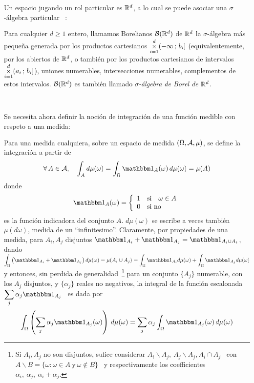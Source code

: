 Un espacio  jugando un rol particular es  $\mathbb{R}^d$, a lo cual  se puede asociar
una    $\sigma$-\'algebra    particular    ~\cite{AthLah06, Bog07:v1, Bog07:v2, Coh13}:
%
\begin{definicion}
  Para  cualquier  $d  \ge  1$  entero,  llamamos  Borelianos  $\mathcal{B}(\mathbb{R}^d)$  de
  $\mathbb{R}^d$  la $\sigma$-\'algebra  m\'as peque\~na  generada por  los productos
  cartesianos   $\displaystyle   \operatorname*{\times}_{i=1}^d  (-\infty   \,   ;  \,   b_i]$
  \big(equivalentemente,  por los  abiertos de  $\mathbb{R}^d$, o  tambi\'en  por los
  productos cartesianos de intervalos  $\displaystyle \operatorname*{\times}_{i=1}^d (a_i \, ;
  \, b_i]$\big), \ie uniones numerables, intersecciones numerables, complementos
  de    estos   intervalos.    $\mathcal{B}(\mathbb{R}^d)$    es   tambi\'en    llamado   {\it
    $\sigma$-\'algebra de Borel de $\mathbb{R}^d$}.
\end{definicion}

\

Se necesita ahora definir la  noci\'on de integraci\'on de una funci\'on medible
con respeto a una medida:
%
\begin{definicion}
  Para una medida  cualquiera, sobre un espacio de  medida $(\Omega,\mathcal{A},\mu)$, se
  define la integraci\'on a partir de
  \[
  \forall \, A \in \A,  \quad \int_A d\mu(\omega) = \int_\Omega \un_A(\omega) \,
  d\mu(\omega) = \mu(A)
  \]
  donde
  \[
  \un_A(\omega) = \left\{
  \begin{array}{clr}
  1 & \mbox{si} \quad \omega \in A\\
  0 & \mbox{si no}
  \end{array} \right.
  \]
  es  la funci\'on  indicadora del  conjunto $A$.   $d\mu(\omega)$ se  escribe a
  veces  tambi\'en $\mu(d\omega)$, medida  de un  ``infinitesimo''.  Claramente,
  por  propiedades  de una  medida,  para $  A_i,  A_j$  disjuntos $\un_{A_i}  +
  \un_{A_j}  =  \un_{A_i \cup  A_i}$,  dando  $\displaystyle \int_\Omega  \left(
    \un_{A_i} + \un_{A_j} \right) d\mu(\omega) = \mu(A_i \cup A_j) = \int_\Omega
  \un_{A_i} d\mu(\omega)  + \int_\Omega \un_{A_j} d\mu(\omega)$  y entonces, sin
  perdida  de  generalidad~\footnote{Si  $A_i,  A_j$ no  son  disjuntos,  sufice
    considerar $A_i\backslash A_j, \: A_j\backslash  A_j, A_i \cap A_j$ \ con $A
    \backslash B = \{ \omega: \omega \in  A \: \mbox{y} \: \omega \not\in B\}$ \
    y respectivamente los coefficientes \  $\alpha_i, \: \alpha_j, \: \alpha_i +
    \alpha_j$.}   para  un  conjunto  $\{  A_j  \}$  numerable,  con  los  $A_j$
  disjuntos, y $\{ \alpha_j \}$ reales no negativos, la integral de la funci\'on
  escalonada \ $\displaystyle \sum_j \alpha_j \un_{A_j}$ \ es dada por
  \[
  \int_\Omega \left( \sum_j \alpha_j \un_{A_j}(\omega) \right) \, d\mu(\omega) =
  \sum_j \alpha_j \int_\Omega \un_{A_j}(\omega) \, d\mu(\omega)
  \]
\end{definicion}


